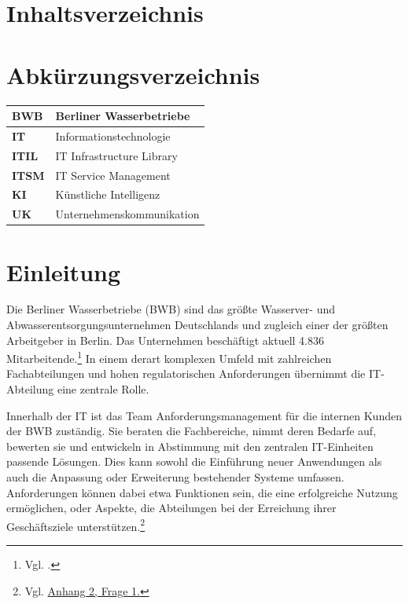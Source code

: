 \documentclass[
    12pt, 
    a4paper,
    ]{scrartcl} %
\begin{document}
\section*{Inhaltsverzeichnis}  
\renewcommand{\contentsname}{}
\vspace{-1.3cm}  %
\tableofcontents %

\clearpage
{}
{}
\section*{Abkürzungsverzeichnis}
\vspace{0.6cm}
\begin{tabular}{p{4cm} p{11.35cm}}   
    \textbf{\normalsize BWB} & \normalsize Berliner Wasserbetriebe \\[0.5cm]
    \hline
    \textbf{\normalsize IT} & \normalsize Informationstechnologie \\[0.5cm]
    \hline
    \textbf{\normalsize ITIL} & \normalsize IT Infrastructure Library \\[0.5cm]
    \hline
    \textbf{\normalsize ITSM} & \normalsize IT Service Management \\[0.5cm]
    \hline
    \textbf{\normalsize KI} & \normalsize Künstliche Intelligenz \\[0.5cm] 
    \hline
    \textbf{\normalsize UK} & \normalsize Unternehmenskommunikation \\[0.5cm] 
\end{tabular}

\newpage
{} %
\setcounter{page}{1}
\section{Einleitung}

Die Berliner Wasserbetriebe (BWB) sind das größte Wasserver- und Abwasserentsorgungsunternehmen Deutschlands und zugleich einer der größten Arbeitgeber in Berlin. Das Unternehmen beschäftigt aktuell 4.836 Mitarbeitende.\footnote{Vgl. \cite{S_BWB}.} In einem derart komplexen Umfeld mit zahlreichen Fachabteilungen und hohen regulatorischen Anforderungen übernimmt die IT-Abteilung eine zentrale Rolle.

Innerhalb der IT ist das Team Anforderungsmanagement für die internen Kunden der BWB zuständig. Sie beraten die Fachbereiche, nimmt deren Bedarfe auf, bewerten sie und entwickeln in Abstimmung mit den zentralen IT-Einheiten passende Lösungen. Dies kann sowohl die Einführung neuer Anwendungen als auch die Anpassung oder Erweiterung bestehender Systeme umfassen. Anforderungen können dabei etwa Funktionen sein, die eine erfolgreiche Nutzung ermöglichen, oder Aspekte, die Abteilungen bei der Erreichung ihrer Geschäftsziele unterstützen.\footnote{Vgl. \hyperref[sec:Anhang2]{Anhang 2, Frage 1.}}
\end{document}
